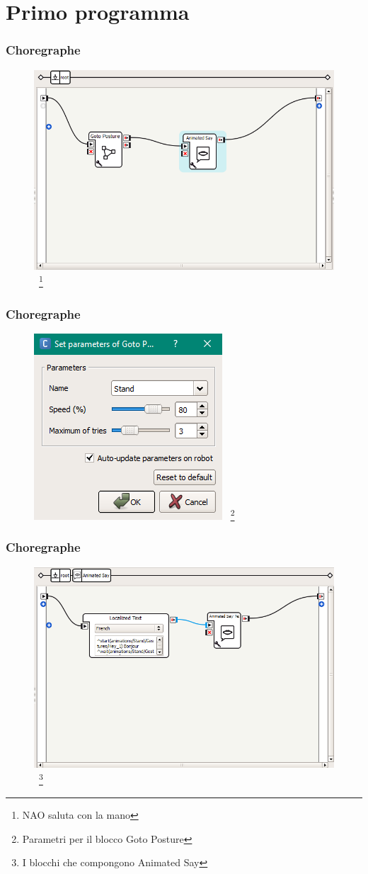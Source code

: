 \documentclass[aspectratio=169]{beamer}
\begin{document}
\section{Primo programma}

\begin{frame}
\frametitle{Choregraphe}
\begin{figure}[ht]
\begin{center}
\includegraphics[width=.6\textwidth]{blocks}
~\footnote{NAO saluta con la mano}
\end{center}
\end{figure}
\end{frame}

\begin{frame}
\frametitle{Choregraphe}
\begin{figure}[ht]
\begin{center}
\includegraphics[width=.4\textwidth]{parameters}
~\footnote{Parametri per il blocco Goto Posture}
\end{center}
\end{figure}
\end{frame}

\begin{frame}
\frametitle{Choregraphe}
\begin{figure}[ht]
\begin{center}
\includegraphics[width=.6\textwidth]{anisay}
~\footnote{I blocchi che compongono Animated Say}
\end{center}
\end{figure}
\end{frame}

\ifx\fulldocument\undefined
\end{document}
